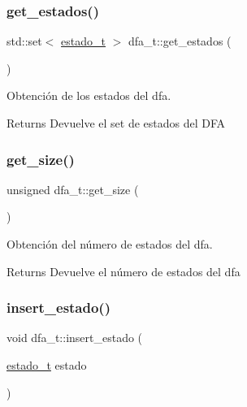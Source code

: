 \subsubsection{\texorpdfstring{get\+\_\+estados()}{get\_estados()}}
{\footnotesize\ttfamily std\+::set$<$ \hyperlink{classestado__t}{estado\+\_\+t} $>$ dfa\+\_\+t\+::get\+\_\+estados (\begin{DoxyParamCaption}{ }\end{DoxyParamCaption})}



Obtención de los estados del dfa. 

\begin{DoxyReturn}{Returns}
Devuelve el set de estados del D\+FA 
\end{DoxyReturn}
\mbox{\label{classdfa__t_a188981b0dbc57a59cb2aef6a39f7015b}} 
\subsubsection{\texorpdfstring{get\+\_\+size()}{get\_size()}}
{\footnotesize\ttfamily unsigned dfa\+\_\+t\+::get\+\_\+size (\begin{DoxyParamCaption}{ }\end{DoxyParamCaption})\hspace{0.3cm}{\ttfamily [inline]}}



Obtención del número de estados del dfa. 

\begin{DoxyReturn}{Returns}
Devuelve el número de estados del dfa 
\end{DoxyReturn}
\mbox{\label{classdfa__t_a7cd98411f9141b1c68ba84a72f9e63d6}} 
\subsubsection{\texorpdfstring{insert\+\_\+estado()}{insert\_estado()}}
{\footnotesize\ttfamily void dfa\+\_\+t\+::insert\+\_\+estado (\begin{DoxyParamCaption}\item[{\hyperlink{classestado__t}{estado\+\_\+t}}]{estado }\end{DoxyParamCaption})}



